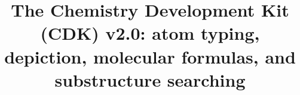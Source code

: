 \documentclass[doublespacing]{bmcart}
\def \cdkversion {v2.0}
\begin{document}
\begin{frontmatter}

\begin{fmbox}

%

\title{The Chemistry Development Kit (CDK) \cdkversion{}: atom typing, depiction, molecular formulas, and substructure searching}

\author[
   addressref={um},                                 %
   email={egon.willighagen@maastrichtuniversity.nl}
]{ }
\author[
   addressref={nm},                                 %
   email={john.mayfield@cantab.net}
]{ }
\author[
   addressref={uppsala},
   email={jonathan.alvarsson@farmbio.uu.se}
]{ }
\author[
   addressref={uppsala},
   email={berg.arvid@gmail.com}
]{ }
\author[
   addressref={azg},                                %
   email={Lars.A.Carlsson@astrazeneca.com}
]{~}
\author[
   addressref={idea},
   email={jeliazkova.nina@gmail.com}
]{~}
\author[
   addressref={leicester},
   email={shk12@le.ac.uk}
]{ }
\author[
   addressref={wi_mit},                             %
   email={pluskal@wi.mit.edu}
]{~}
\author[
   addressref={miquel},                             %
   email={mrojas@qca.es}
]{~}
\author[
   addressref={uppsala},
   email={ola.spjuth@farmbio.uu.se}
]{ }
\author[
   addressref={gilleain},                           %
   email={gilleain.torrance@gmail.com}
]{ }
\author[
   addressref={um},
   email={chris.evelo@maastrichtuniversity.nl}
]{~}
\author[
   addressref={nih},
   email={guhar@mail.nih.gov}
]{ }
\author[
   addressref={jena},
   email={christoph.steinbeck@uni-jena.de}
]{~}


\end{fmbox}
\end{frontmatter}
\end{document}
